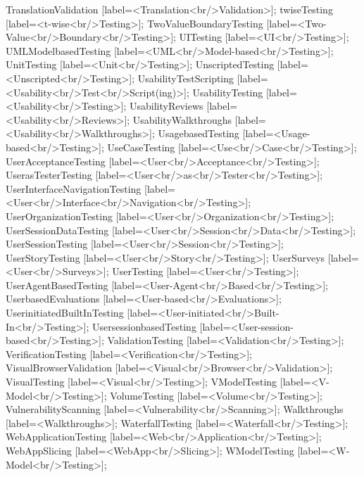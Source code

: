 \documentclass{article}
\begin{document}
{TranslationValidation [label=<Translation<br/>Validation>];
twiseTesting [label=<t-wise<br/>Testing>];
TwoValueBoundaryTesting [label=<Two-Value<br/>Boundary<br/>Testing>];
UITesting [label=<UI<br/>Testing>];
UMLModelbasedTesting [label=<UML<br/>Model-based<br/>Testing>];
UnitTesting [label=<Unit<br/>Testing>];
UnscriptedTesting [label=<Unscripted<br/>Testing>];
UsabilityTestScripting [label=<Usability<br/>Test<br/>Script(ing)>];
UsabilityTesting [label=<Usability<br/>Testing>];
UsabilityReviews [label=<Usability<br/>Reviews>];
UsabilityWalkthroughs [label=<Usability<br/>Walkthroughs>];
UsagebasedTesting [label=<Usage-based<br/>Testing>];
UseCaseTesting [label=<Use<br/>Case<br/>Testing>];
UserAcceptanceTesting [label=<User<br/>Acceptance<br/>Testing>];
UserasTesterTesting [label=<User<br/>as<br/>Tester<br/>Testing>];
UserInterfaceNavigationTesting [label=<User<br/>Interface<br/>Navigation<br/>Testing>];
UserOrganizationTesting [label=<User<br/>Organization<br/>Testing>];
UserSessionDataTesting [label=<User<br/>Session<br/>Data<br/>Testing>];
UserSessionTesting [label=<User<br/>Session<br/>Testing>];
UserStoryTesting [label=<User<br/>Story<br/>Testing>];
UserSurveys [label=<User<br/>Surveys>];
UserTesting [label=<User<br/>Testing>];
UserAgentBasedTesting [label=<User-Agent<br/>Based<br/>Testing>];
UserbasedEvaluations [label=<User-based<br/>Evaluations>];
UserinitiatedBuiltInTesting [label=<User-initiated<br/>Built-In<br/>Testing>];
UsersessionbasedTesting [label=<User-session-based<br/>Testing>];
ValidationTesting [label=<Validation<br/>Testing>];
VerificationTesting [label=<Verification<br/>Testing>];
VisualBrowserValidation [label=<Visual<br/>Browser<br/>Validation>];
VisualTesting [label=<Visual<br/>Testing>];
VModelTesting [label=<V-Model<br/>Testing>];
VolumeTesting [label=<Volume<br/>Testing>];
VulnerabilityScanning [label=<Vulnerability<br/>Scanning>];
Walkthroughs [label=<Walkthroughs>];
WaterfallTesting [label=<Waterfall<br/>Testing>];
WebApplicationTesting [label=<Web<br/>Application<br/>Testing>];
WebAppSlicing [label=<WebApp<br/>Slicing>];
WModelTesting [label=<W-Model<br/>Testing>];

}
\end{document}
